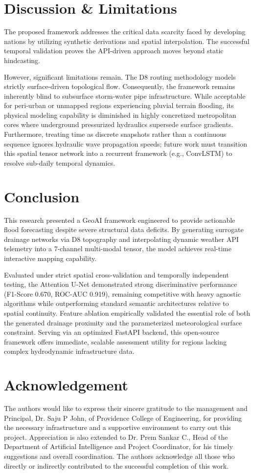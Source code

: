 \documentclass[conference]{IEEEtran}
\begin{document}
\section{Discussion \& Limitations}
The proposed framework addresses the critical data scarcity faced by developing nations by utilizing synthetic derivations and spatial interpolation. The successful temporal validation proves the API-driven approach moves beyond static hindcasting.

However, significant limitations remain. The D8 routing methodology models strictly surface-driven topological flow. Consequently, the framework remains inherently blind to subsurface storm-water pipe infrastructure. While acceptable for peri-urban or unmapped regions experiencing pluvial terrain flooding, its physical modeling capability is diminished in highly concretized metropolitan cores where underground pressurized hydraulics supersede surface gradients. Furthermore, treating time as discrete snapshots rather than a continuous sequence ignores hydraulic wave propagation speeds; future work must transition this spatial tensor network into a recurrent framework (e.g., ConvLSTM) to resolve sub-daily temporal dynamics.

\section{Conclusion}
This research presented a GeoAI framework engineered to provide actionable flood forecasting despite severe structural data deficits. By generating surrogate drainage networks via D8 topography and interpolating dynamic weather API telemetry into a 7-channel multi-modal tensor, the model achieves real-time interactive mapping capability. 

Evaluated under strict spatial cross-validation and temporally independent testing, the Attention U-Net demonstrated strong discriminative performance (F1-Score 0.670, ROC-AUC 0.919), remaining competitive with heavy agnostic algorithms while outperforming standard semantic architectures relative to spatial continuity. Feature ablation empirically validated the essential role of both the generated drainage proximity and the parameterized meteorological surface constraint. Serving via an optimized FastAPI backend, this open-source framework offers immediate, scalable assessment utility for regions lacking complex hydrodynamic infrastructure data.

\section*{Acknowledgement}
The authors would like to express their sincere gratitude to the management and Principal, Dr. Saju P John, of Providence College of Engineering, for providing the necessary infrastructure and a supportive environment to carry out this project. Appreciation is also extended to Dr. Prem Sankar C., Head of the Department of Artificial Intelligence and Project Coordinator, for his timely suggestions and overall coordination. The authors acknowledge all those who directly or indirectly contributed to the successful completion of this work.
\end{document}
